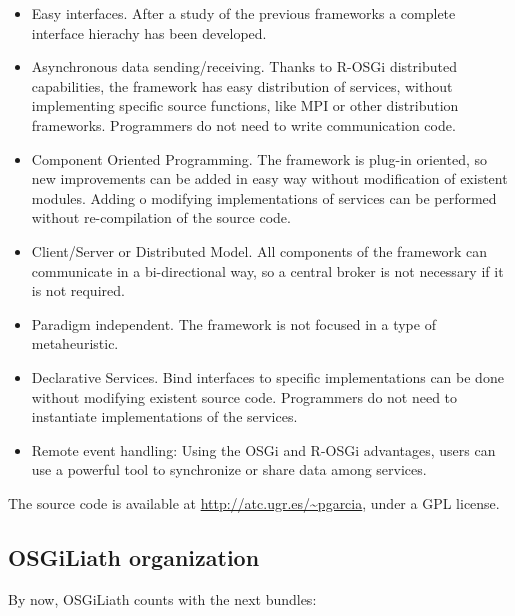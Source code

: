 \documentclass{sig-alternate}
\begin{document}
\begin{itemize}
\item Easy interfaces. After a study of the previous frameworks a complete interface hierachy has been developed.
\item Asynchronous data sending/receiving. Thanks to R-OSGi distributed capabilities, the framework has easy distribution of services, without implementing specific source functions, like MPI or other distribution frameworks. Programmers do not need to write communication code. 
\item Component Oriented Programming. The framework is plug-in oriented, so new improvements can be added in easy way without modification of existent modules. Adding o modifying implementations of services can be performed without re-compilation of the source code.
\item Client/Server or Distributed Model. All components of the framework can communicate in a bi-directional way, so a central broker is not necessary if it is not required.
\item Paradigm independent. The framework is not focused in a type of metaheuristic.
\item Declarative Services. Bind interfaces to specific implementations can be done without modifying existent source code. Programmers do not need to instantiate implementations of the services.
\item Remote event handling: Using the OSGi and R-OSGi advantages, users can use a powerful tool to synchronize or share data among services.
\end{itemize}

The source code is available at \url{http://atc.ugr.es/~pgarcia}, under a GPL license.

\subsection{OSGiLiath organization}
By now, OSGiLiath counts with the next bundles:
\end{document}
